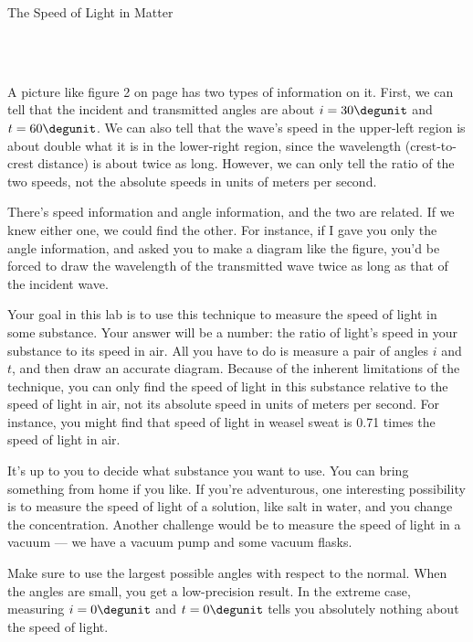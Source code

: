\begin{lab}[0]{The Speed of Light in Matter}

\apparatus
{}\\
\\


A picture like figure 2 on page \pageref{lab-fig-water} has two types of information on it. 
First, we can tell that the incident and transmitted angles are about $i=30\degunit$ and $t=60\degunit$.
We can also tell that the wave's speed in the upper-left region is about double what it is in the lower-right region, since
the wavelength (crest-to-crest distance) is about twice as long. However, we can only tell the ratio of
the two speeds, not the absolute speeds in units of meters per second.

There's speed information and angle information, and the two are related. If we knew either one, we could find
the other. For instance, if I gave you only the angle information, and asked you to make a diagram like
the figure, you'd be forced to draw the wavelength of the transmitted wave twice as long as that of the
incident wave.

Your goal in this lab is to use this technique to measure the speed of light in some substance.
Your answer will be a number: the ratio of light's speed in your substance to its speed in air.
All you have to do is measure a pair of angles $i$ and $t$, and then draw an accurate diagram.
Because of the inherent limitations of the technique, you can only find the speed of light in this
substance relative to the speed of light in air, not its absolute speed in units of
meters per second. For instance, you might find that speed of light in weasel sweat
is 0.71 times the speed of light in air.

It's up to you to decide what substance you want to use.
You can bring something from home if you like. If you're adventurous, one interesting possibility
is to measure the speed of light of a solution, like salt in water, and you change the concentration.
Another challenge would be to measure the speed of light in a vacuum --- we have a vacuum pump and
some vacuum flasks.

Make sure to use the largest possible angles with respect to the normal. When the angles are
small, you get a low-precision result. In the extreme case, measuring $i=0\degunit$ and
$t=0\degunit$ tells you absolutely nothing about the speed of light.
\end{lab}

